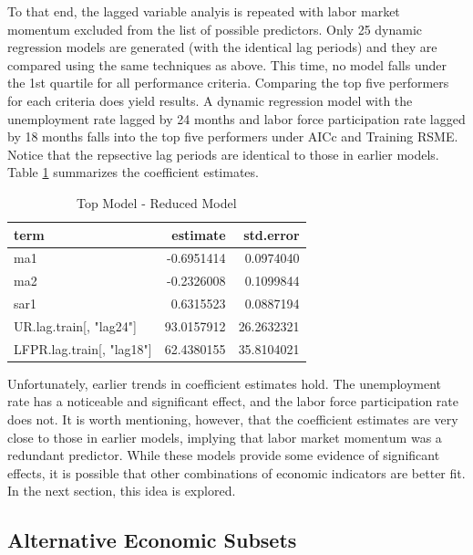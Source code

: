 \documentclass[12pt,letterpaper,toc=flat,oneside]{report}
\theoremstyle{definition}
\theoremstyle{definition}
\theoremstyle{definition}
\theoremstyle{remark}
\begin{document}
To that end, the lagged variable analyis is repeated with labor market
momentum excluded from the list of possible predictors. Only 25 dynamic
regression models are generated (with the identical lag periods) and
they are compared using the same techniques as above. This time, no
model falls under the 1st quartile for all performance criteria.
Comparing the top five performers for each criteria does yield results.
A dynamic regression model with the unemployment rate lagged by 24
months and labor force participation rate lagged by 18 months falls into
the top five performers under AICc and Training RSME. Notice that the
repsective lag periods are identical to those in earlier models. Table
\ref{tab:reduced-1} summarizes the coefficient estimates.

\begin{table}[!h]

\caption{\label{tab:reduced-1}Top Model - Reduced Model}
\centering
\begin{tabular}[t]{lrr}
\toprule
\bfseries{term} & \bfseries{estimate} & \bfseries{std.error}\\
\midrule
ma1 & -0.6951414 & 0.0974040\\
ma2 & -0.2326008 & 0.1099844\\
sar1 & 0.6315523 & 0.0887194\\
UR.lag.train[, "lag24"] & 93.0157912 & 26.2632321\\
LFPR.lag.train[, "lag18"] & 62.4380155 & 35.8104021\\
\bottomrule
\end{tabular}
\end{table}

Unfortunately, earlier trends in coefficient estimates hold. The
unemployment rate has a noticeable and significant effect, and the labor
force participation rate does not. It is worth mentioning, however, that
the coefficient estimates are very close to those in earlier models,
implying that labor market momentum was a redundant predictor. While
these models provide some evidence of significant effects, it is
possible that other combinations of economic indicators are better fit.
In the next section, this idea is explored.

\hypertarget{alternative-economic-subsets}{%
\subsection{Alternative Economic
Subsets}\label{alternative-economic-subsets}}
\end{document}
